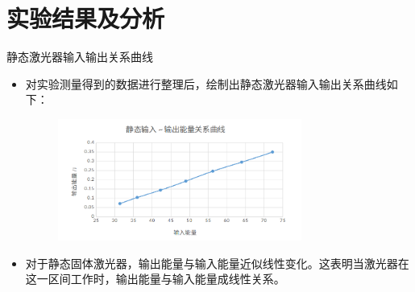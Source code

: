 \documentclass{beamer}
\begin{document}
\section{实验结果及分析}

\begin{frame}{静态激光器输入输出关系曲线}
  \begin{itemize}
    \item 对实验测量得到的数据进行整理后，绘制出静态激光器输入输出关系曲线如下：
    \begin{figure}
      \includegraphics[height=4cm,width=8cm]{images/7.png}
      \label{fg7}
    \end{figure}
    \item 对于静态固体激光器，输出能量与输入能量近似线性变化。这表明当激光器在这一区间工作时，输出能量与输入能量成线性关系。
  \end{itemize}
\end{frame}
\end{document}
